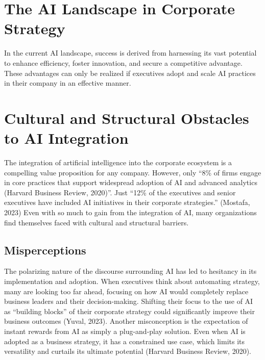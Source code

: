 \documentclass[
]{book}
\begin{document}
\hypertarget{the-ai-landscape-in-corporate-strategy}{%
\section{The AI Landscape in Corporate Strategy}\label{the-ai-landscape-in-corporate-strategy}}

In the current AI landscape, success is derived from harnessing its vast potential to enhance efficiency, foster innovation, and secure a competitive advantage. These advantages can only be realized if executives adopt and scale AI practices in their company in an effective manner.

\hypertarget{cultural-and-structural-obstacles-to-ai-integration}{%
\section{Cultural and Structural Obstacles to AI Integration}\label{cultural-and-structural-obstacles-to-ai-integration}}

The integration of artificial intelligence into the corporate ecosystem is a compelling value proposition for any company. However, only ``8\% of firms engage in core practices that support widespread adoption of AI and advanced analytics (Harvard Business Review, 2020)''. Just ``12\% of the executives and senior executives have included AI initiatives in their corporate strategies.'' (Mostafa, 2023) Even with so much to gain from the integration of AI, many organizations find themselves faced with cultural and structural barriers.

\hypertarget{misperceptions}{%
\subsection{Misperceptions}\label{misperceptions}}

The polarizing nature of the discourse surrounding AI has led to hesitancy in its implementation and adoption. When executives think about automating strategy, many are looking too far ahead, focusing on how AI would completely replace business leaders and their decision-making. Shifting their focus to the use of AI as ``building blocks'' of their corporate strategy could significantly improve their business outcomes (Yuval, 2023). Another misconception is the expectation of instant rewards from AI as simply a plug-and-play solution. Even when AI is adopted as a business strategy, it has a constrained use case, which limits its versatility and curtails its ultimate potential (Harvard Business Review, 2020).
\end{document}
